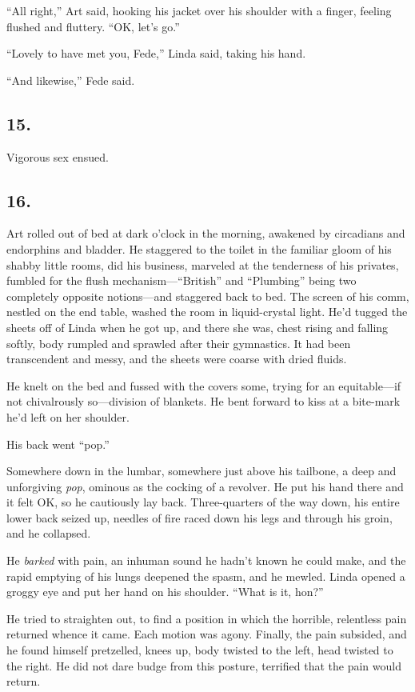 “All right,” Art said, hooking his jacket over his shoulder with a
finger, feeling flushed and fluttery. “OK, let’s go.”

“Lovely to have met you, Fede,” Linda said, taking his hand.

“And likewise,” Fede said.

\subsection{15.}

Vigorous sex ensued.

\subsection{16.}

Art rolled out of bed at dark o’clock in the morning, awakened by
circadians and endorphins and bladder. He staggered to the toilet
in the familiar gloom of his shabby little rooms, did his business,
marveled at the tenderness of his privates, fumbled for the flush
mechanism—“British” and “Plumbing” being two completely opposite
notions—and staggered back to bed. The screen of his comm, nestled
on the end table, washed the room in liquid-crystal light. He’d
tugged the sheets off of Linda when he got up, and there she was,
chest rising and falling softly, body rumpled and sprawled after
their gymnastics. It had been transcendent and messy, and the
sheets were coarse with dried fluids.

He knelt on the bed and fussed with the covers some, trying for an
equitable—if not chivalrously so—division of blankets. He bent
forward to kiss at a bite-mark he’d left on her shoulder.

His back went “pop.”

Somewhere down in the lumbar, somewhere just above his tailbone, a
deep and unforgiving \emph{pop}, ominous as the cocking of a
revolver. He put his hand there and it felt OK, so he cautiously
lay back. Three-quarters of the way down, his entire lower back
seized up, needles of fire raced down his legs and through his
groin, and he collapsed.

He \emph{barked} with pain, an inhuman sound he hadn’t known he
could make, and the rapid emptying of his lungs deepened the spasm,
and he mewled. Linda opened a groggy eye and put her hand on his
shoulder. “What is it, hon?”

He tried to straighten out, to find a position in which the
horrible, relentless pain returned whence it came. Each motion was
agony. Finally, the pain subsided, and he found himself pretzelled,
knees up, body twisted to the left, head twisted to the right. He
did not dare budge from this posture, terrified that the pain would
return.

